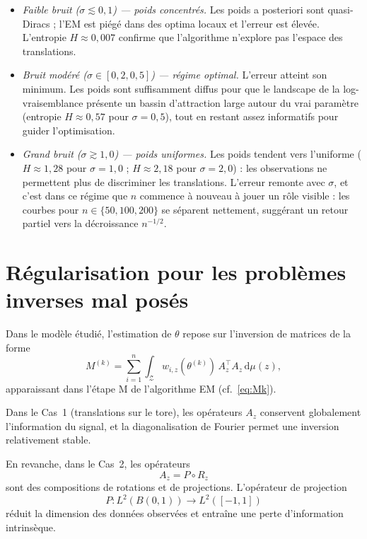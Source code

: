 \documentclass[12pt, a4paper]{article}
\theoremstyle{definition}
\newcommand{\Zcal}{\mathcal{Z}}
\begin{document}
\begin{itemize}
  \item \textit{Faible bruit ($\sigma \lesssim 0{,}1$) — poids concentrés.}
    Les poids a posteriori sont quasi-Diracs ; l'EM est piégé dans des optima
    locaux et l'erreur est élevée. L'entropie $H \approx 0{,}007$ confirme que
    l'algorithme n'explore pas l'espace des translations.

  \item \textit{Bruit modéré ($\sigma \in [0{,}2, 0{,}5]$) — régime optimal.}
    L'erreur atteint son minimum. Les poids sont suffisamment diffus pour que
    le landscape de la log-vraisemblance présente un bassin d'attraction large
    autour du vrai paramètre (entropie $H \approx 0{,}57$ pour $\sigma = 0{,}5$),
    tout en restant assez informatifs pour guider l'optimisation.

  \item \textit{Grand bruit ($\sigma \gtrsim 1{,}0$) — poids uniformes.}
    Les poids tendent vers l'uniforme ($H \approx 1{,}28$ pour $\sigma = 1{,}0$ ;
    $H \approx 2{,}18$ pour $\sigma = 2{,}0$) : les observations ne permettent
    plus de discriminer les translations. L'erreur remonte avec $\sigma$,
    et c'est dans ce régime que $n$ commence à nouveau à jouer un rôle visible :
    les courbes pour $n \in \{50, 100, 200\}$ se séparent nettement,
    suggérant un retour partiel vers la décroissance $n^{-1/2}$.
\end{itemize}

% 
\newpage
\section{Régularisation pour les problèmes inverses mal posés}
\label{sec:regularisation}

Dans le modèle étudié, l’estimation de $\theta$ repose sur l’inversion de matrices de la forme
\[
M^{(k)}
=
\sum_{i=1}^n \int_{\Zcal} w_{i,z}(\theta^{(k)})\, A_z^\top A_z \,\mathrm{d}\mu(z),
\]
apparaissant dans l’étape M de l’algorithme EM (cf.~\eqref{eq:Mk}).

Dans le Cas~1 (translations sur le tore), les opérateurs $A_z$ conservent globalement
l’information du signal, et la diagonalisation de Fourier permet une inversion
relativement stable.

En revanche, dans le Cas~2, les opérateurs
\[
A_z = P \circ R_z
\]
sont des compositions de rotations et de projections. L’opérateur de projection
\[
P : L^2(B(0,1)) \to L^2([-1,1])
\]
réduit la dimension des données observées et entraîne une perte d’information intrinsèque.
\end{document}
